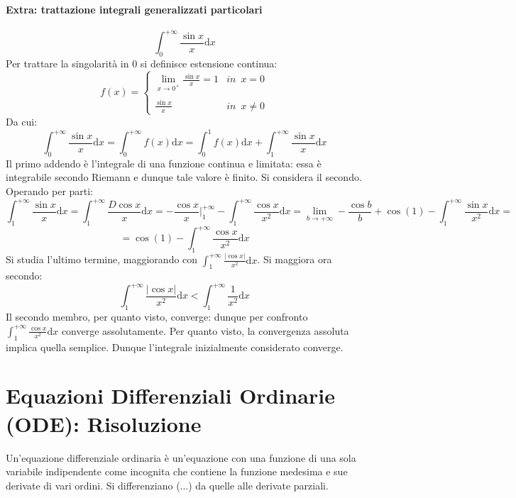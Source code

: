 \documentclass[10pt]{article}
\theoremstyle{plain}
\begin{document}
\paragraph{Extra: trattazione integrali generalizzati particolari}
\[\int_0^{+\infty} \frac{\sin x}{x}\textrm{d}x\]
Per trattare la singolarità in $0$ si definisce estensione continua:
\[f(x) = \begin{cases}
    \lim\limits_{x \rightarrow 0^+} \frac{\sin x}{x} = 1 & in \enspace x=0\\
    \\
    \frac{\sin x}{x} & in \enspace x\neq 0
\end{cases}\]
Da cui:
\[\int_0^{+\infty} \frac{\sin x}{x}\textrm{d}x = \int_0^{+\infty} f(x) \textrm{d}x = \int_0^{1} f(x)\textrm{d}x + \int_1^{+\infty} \frac{\sin x}{x}\textrm{d}x\]
Il primo addendo è l'integrale di una funzione continua e limitata: essa è integrabile secondo Riemann e dunque tale valore è finito. Si considera il secondo.
\\Operando per parti:
\[\int_1^{+\infty} \frac{\sin x}{x}\textrm{d}x = \int_1^{+\infty} \frac{D\cos x}{x}\textrm{d}x = -\frac{\cos x}{x}\bigg|_1^{+\infty} - \int_1^{+\infty} \frac{\cos x}{x^2}\textrm{d}x = \lim\limits_{b \rightarrow +\infty} - \frac{\cos b}{b} + \cos (1) - \int_1^{+\infty} \frac{\sin x}{x^2}\textrm{d}x = \]
\[= \cos (1) - \int_1^{+\infty} \frac{\cos x}{x^2}\textrm{d}x\]
Si studia l'ultimo termine, maggiorando con $\int_1^{+\infty} \frac{|\cos x|}{x^2}\textrm{d}x$. Si maggiora ora secondo:
\[\int_1^{+\infty} \frac{|\cos x|}{x^2}\textrm{d}x < \int_1^{+\infty} \frac{1}{x^2}\textrm{d}x\]
Il secondo membro, per quanto visto, converge: dunque per confronto $\int_1^{+\infty} \frac{\cos x}{x^2}\textrm{d}x$ converge assolutamente. Per quanto visto, la convergenza assoluta implica quella semplice. Dunque l'integrale inizialmente considerato converge.


\section{Equazioni Differenziali Ordinarie (ODE): Risoluzione}

\begin{defin}
    Un'equazione differenziale ordinaria è un'equazione con una funzione di una sola variabile indipendente come incognita che contiene la funzione medesima e sue derivate di vari ordini. Si differenziano (...) da quelle alle derivate parziali.
\end{defin}
\end{document}

